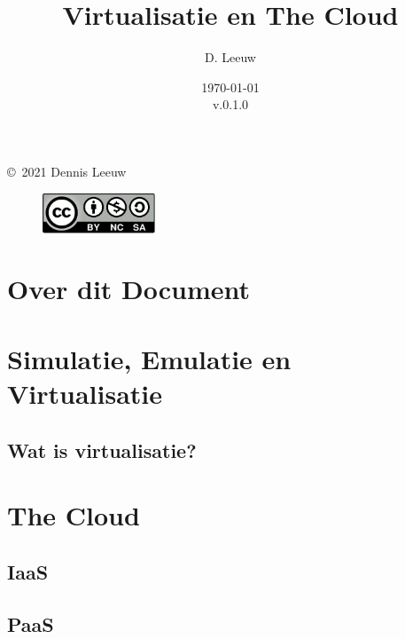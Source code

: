 \documentclass[a4paper,12pt,twoside,openright,titlepage]{book}
\author{D. Leeuw}
\title{Virtualisatie en The Cloud}
\date{\today\\v.0.1.0}
\begin{document}

\maketitle

\copyright\ 2021 Dennis Leeuw\\

\begin{figure}
\includegraphics[width=0.3\textwidth]{CC-BY-SA-NC.png}
\end{figure}

\bigskip




\frontmatter
\chapter{Over dit Document}



\tableofcontents

\mainmatter
\chapter{Simulatie, Emulatie en Virtualisatie}

\section{Wat is virtualisatie?}


\chapter{The Cloud}

\section{IaaS}

\section{PaaS}

\end{document}
